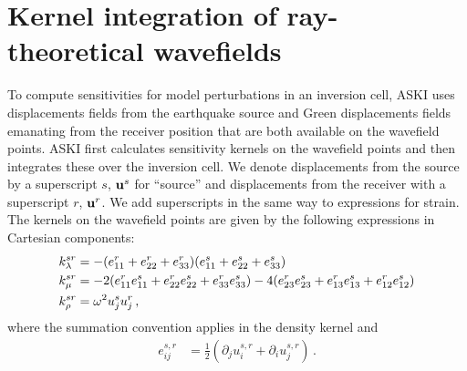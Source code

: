 \section{Kernel integration of ray-theoretical wavefields}
%
To compute sensitivities for model perturbations in an inversion cell, ASKI uses displacements fields from the earthquake source and Green displacements fields emanating from the receiver position that are both available on the wavefield points. ASKI first calculates sensitivity kernels on the wavefield points and then integrates these over the inversion cell. We denote displacements from the source by a superscript $s$, $\textbf u^s$ for ``source'' and displacements from the receiver with a superscript $r$, $\textbf u^r$. We add superscripts in the same way to expressions for strain. The kernels on the wavefield points are given by the following expressions in Cartesian components:
%
\begin{align}
   k^{sr}_{\lambda} &= -(e^r_{11}+e^r_{22}+e^r_{33})(e^s_{11}+e^s_{22}+e^s_{33}) \notag \\
   k^{sr}_{\mu} &= -2(e^r_{11}e^s_{11}+e^r_{22}e^s_{22}+e^r_{33}e^s_{33})
                  -4(e^r_{23}e^s_{23}+e^r_{13}e^s_{13}+e^r_{12}e^s_{12}) \notag \\
   k^{sr}_{\rho} &= \omega^2 u^s_j u^r_j \,,
\end{align}
%
where the summation convention applies in the density kernel and
%
\begin{align}
   e^{s,r}_{ij} &= \frac{1}{2}(\partial_j u^{s,r}_i + \partial_i u^{s,r}_j) \,.
\end{align}

